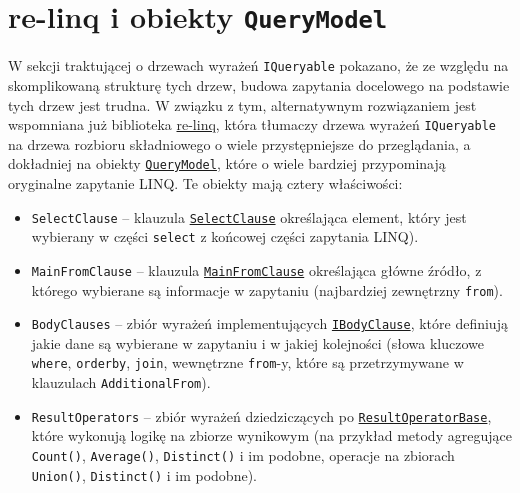 \section{re-linq i obiekty \texttt{QueryModel}}
W sekcji traktującej o drzewach wyrażeń \texttt{IQueryable} pokazano, że ze względu na skomplikowaną strukturę tych drzew, budowa zapytania docelowego na podstawie tych drzew jest trudna. W związku z tym, alternatywnym rozwiązaniem jest wspomniana już biblioteka \href{https://github.com/re-motion/Relinq}{re-linq}, która tłumaczy drzewa wyrażeń \texttt{IQueryable} na drzewa rozbioru składniowego o wiele przystępniejsze do przeglądania, a dokładniej na obiekty \href{https://github.com/re-motion/Relinq/blob/82fdca6a4bfd942bb4a71dd20ab9c5af0aea0541/Core/QueryModel.cs}{\texttt{QueryModel}}, które o wiele bardziej przypominają oryginalne zapytanie LINQ. Te obiekty mają cztery właściwości:

\begin{itemize}
\item \texttt{SelectClause} – klauzula \href{https://github.com/re-motion/Relinq/blob/82fdca6a4bfd942bb4a71dd20ab9c5af0aea0541/Core/Clauses/SelectClause.cs}{\texttt{SelectClause}} określająca element, który jest wybierany w części \texttt{select} z końcowej części zapytania LINQ).
\item \texttt{MainFromClause} – klauzula \href{https://github.com/re-motion/Relinq/blob/82fdca6a4bfd942bb4a71dd20ab9c5af0aea0541/Core/Clauses/MainFromClause.cs}{\texttt{MainFromClause}} określająca główne źródło, z którego wybierane są informacje w zapytaniu (najbardziej zewnętrzny \texttt{from}).
\item \texttt{BodyClauses} – zbiór wyrażeń implementujących \href{https://github.com/re-motion/Relinq/blob/82fdca6a4bfd942bb4a71dd20ab9c5af0aea0541/Core/Clauses/IBodyClause.cs}{\texttt{IBodyClause}}, które definiują jakie dane są wybierane w zapytaniu i w jakiej kolejności (słowa kluczowe \texttt{where}, \texttt{orderby}, \texttt{join}, wewnętrzne \texttt{from}-y, które są przetrzymywane w klauzulach \texttt{AdditionalFrom}).
\item \texttt{ResultOperators} – zbiór wyrażeń dziedziczących po \href{https://github.com/re-motion/Relinq/blob/82fdca6a4bfd942bb4a71dd20ab9c5af0aea0541/Core/Clauses/ResultOperatorBase.cs}{\texttt{ResultOperatorBase}}, które wykonują logikę na zbiorze wynikowym (na przykład metody agregujące \texttt{Count()}, \texttt{Average()}, \texttt{Distinct()} i im podobne, operacje na zbiorach \texttt{Union()}, \texttt{Distinct()} i im podobne).
\end{itemize}

